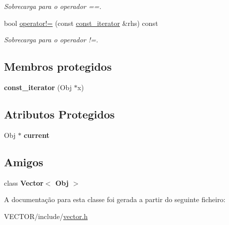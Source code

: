 \begin{DoxyCompactItemize}
\begin{DoxyCompactList}\small\item\em Sobrecarga para o operador ==. \end{DoxyCompactList}\item 
bool \hyperlink{class_vector_1_1const__iterator_a0e3161e20da4a0971a09dd294057e72a}{operator!=} (const \hyperlink{class_vector_1_1const__iterator}{const\+\_\+iterator} \&rhs) const \hypertarget{class_vector_1_1const__iterator_a0e3161e20da4a0971a09dd294057e72a}{}\label{class_vector_1_1const__iterator_a0e3161e20da4a0971a09dd294057e72a}

\begin{DoxyCompactList}\small\item\em Sobrecarga para o operador !=. \end{DoxyCompactList}\end{DoxyCompactItemize}
\subsection*{Membros protegidos}
\begin{DoxyCompactItemize}
\item 
{\bfseries const\+\_\+iterator} (Obj $\ast$x)\hypertarget{class_vector_1_1const__iterator_ab7a8718b0a35ab2e8e6c2c669db50672}{}\label{class_vector_1_1const__iterator_ab7a8718b0a35ab2e8e6c2c669db50672}

\end{DoxyCompactItemize}
\subsection*{Atributos Protegidos}
\begin{DoxyCompactItemize}
\item 
Obj $\ast$ {\bfseries current}\hypertarget{class_vector_1_1const__iterator_ac3f8518218a27c6a0aff658955b80079}{}\label{class_vector_1_1const__iterator_ac3f8518218a27c6a0aff658955b80079}

\end{DoxyCompactItemize}
\subsection*{Amigos}
\begin{DoxyCompactItemize}
\item 
class {\bfseries Vector$<$ Obj $>$}\hypertarget{class_vector_1_1const__iterator_a93580d986919dca737b45fdf1c366bfa}{}\label{class_vector_1_1const__iterator_a93580d986919dca737b45fdf1c366bfa}

\end{DoxyCompactItemize}


A documentação para esta classe foi gerada a partir do seguinte ficheiro\+:\begin{DoxyCompactItemize}
\item 
V\+E\+C\+T\+O\+R/include/\hyperlink{vector_8h}{vector.\+h}\end{DoxyCompactItemize}
